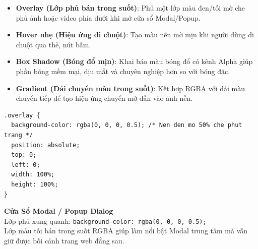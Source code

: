 \documentclass[11pt,oneside]{book}
\newcommand{\codeinline}[1]{\textcolor{accentOrange}{\texttt{#1}}}
\begin{document}
\begin{conceptBox}
\begin{itemize}[leftmargin=1.5em, itemsep=3pt, parsep=0pt]
    \item \textbf{Overlay (Lớp phủ bán trong suốt)}: Phủ một lớp màu đen/tối mờ che phủ ảnh hoặc video phía dưới khi mở cửa sổ Modal/Popup.
    \item \textbf{Hover nhẹ (Hiệu ứng di chuột)}: Tạo màu nền mờ mịn khi người dùng di chuột qua thẻ, nút bấm.
    \item \textbf{Box Shadow (Bóng đổ mịn)}: Khai báo màu bóng đổ có kênh Alpha giúp phần bóng mềm mại, dịu mắt và chuyên nghiệp hơn so với bóng đặc.
    \item \textbf{Gradient (Dải chuyển màu trong suốt)}: Kết hợp RGBA với dải màu chuyển tiếp để tạo hiệu ứng chuyển mờ dần vào ảnh nền.
\end{itemize}
\end{conceptBox}

\begin{codeWindow}
\begin{lstlisting}[language=CSS3]
.overlay {
  background-color: rgba(0, 0, 0, 0.5); /* Nen den mo 50% che phut trang */
  position: absolute;
  top: 0;
  left: 0;
  width: 100%;
  height: 100%;
}
\end{lstlisting}
\end{codeWindow}

\begin{browserWindow}
\begin{tcolorbox}[
    enhanced,
    colback=black!65,
    colframe=black!80,
    arc=6pt, boxrule=0.8pt,
    top=14pt, bottom=14pt, left=14pt, right=14pt
]
  \centering
  \begin{tcolorbox}[
      enhanced,
      width=0.88\linewidth,
      colback=white,
      colframe=primaryBlue!40,
      arc=6pt, boxrule=1pt,
      top=10pt, bottom=10pt, left=12pt, right=12pt,
      drop shadow=black!40!white
  ]
    \centering
    {\sffamily\bfseries\large\color{primaryBlue} Cửa Sổ Modal / Popup Dialog}\\[6pt]
    {\sffamily\small\color{darkText} Lớp phủ xung quanh: \codeinline{background-color: rgba(0, 0, 0, 0.5);}}\\[4pt]
    {\sffamily\small\color{gray} Lớp màu tối bán trong suốt RGBA giúp làm nổi bật Modal trung tâm mà vẫn giữ được bối cảnh trang web đằng sau.}
  \end{tcolorbox}
\end{tcolorbox}
\end{browserWindow}
\end{document}
